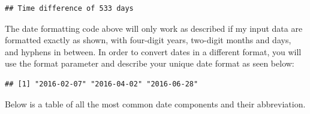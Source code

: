 \documentclass[]{book}
\newenvironment{Shaded}{\begin{snugshade}}{\end{snugshade}}
\newcommand{\KeywordTok}[1]{\textcolor[rgb]{0.13,0.29,0.53}{\textbf{{#1}}}}
\newcommand{\DataTypeTok}[1]{\textcolor[rgb]{0.13,0.29,0.53}{{#1}}}
\newcommand{\StringTok}[1]{\textcolor[rgb]{0.31,0.60,0.02}{{#1}}}
\newcommand{\CommentTok}[1]{\textcolor[rgb]{0.56,0.35,0.01}{\textit{{#1}}}}
\newcommand{\NormalTok}[1]{{#1}}
\begin{document}
\begin{verbatim}
## Time difference of 533 days
\end{verbatim}

The date formatting code above will only work as described if my input
data are formatted exactly as shown, with four-digit years, two-digit
months and days, and hyphens in between. In order to convert dates in a
different format, you will use the format parameter and describe your
unique date format as seen below:

\begin{Shaded}
\end{Shaded}

\begin{verbatim}
## [1] "2016-02-07" "2016-04-02" "2016-06-28"
\end{verbatim}

Below is a table of all the most common date components and their
abbreviation.
\end{document}
